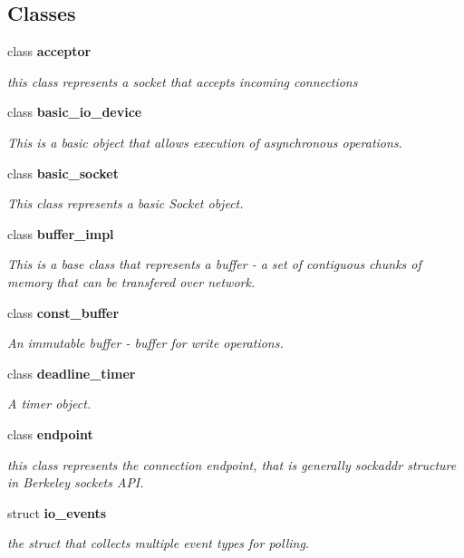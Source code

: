 \subsection*{Classes}
\begin{DoxyCompactItemize}
\item 
class {\bf acceptor}
\begin{DoxyCompactList}\small\item\em this class represents a socket that accepts incoming connections \end{DoxyCompactList}\item 
class {\bf basic\+\_\+io\+\_\+device}
\begin{DoxyCompactList}\small\item\em This is a basic object that allows execution of asynchronous operations. \end{DoxyCompactList}\item 
class {\bf basic\+\_\+socket}
\begin{DoxyCompactList}\small\item\em This class represents a basic Socket object. \end{DoxyCompactList}\item 
class {\bf buffer\+\_\+impl}
\begin{DoxyCompactList}\small\item\em This is a base class that represents a buffer -\/ a set of contiguous chunks of memory that can be transfered over network. \end{DoxyCompactList}\item 
class {\bf const\+\_\+buffer}
\begin{DoxyCompactList}\small\item\em An immutable buffer -\/ buffer for write operations. \end{DoxyCompactList}\item 
class {\bf deadline\+\_\+timer}
\begin{DoxyCompactList}\small\item\em A timer object. \end{DoxyCompactList}\item 
class {\bf endpoint}
\begin{DoxyCompactList}\small\item\em this class represents the connection endpoint, that is generally sockaddr structure in Berkeley sockets A\+PI. \end{DoxyCompactList}\item 
struct {\bf io\+\_\+events}
\begin{DoxyCompactList}\small\item\em the struct that collects multiple event types for polling. \end{DoxyCompactList}\item 

\end{DoxyCompactItemize}
